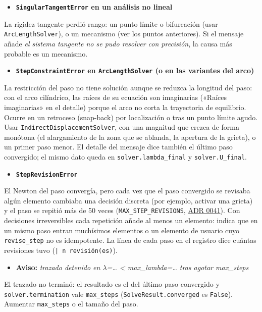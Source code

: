 \documentclass[11pt,oneside]{report}
\begin{document}
\begin{itemize}
  \item \textbf{\texttt{SingularTangentError} en un análisis no lineal}
\end{itemize}
  La rigidez tangente perdió rango: un punto límite o bifurcación (usar \texttt{ArcLengthSolver}), o un mecanismo (ver los puntos anteriores). Si el mensaje añade \textit{\textquotedbl{}el sistema tangente no se pudo resolver con precisión\textquotedbl{}}, la causa más probable es un mecanismo.

\begin{itemize}
  \item \textbf{\texttt{StepConstraintError} en \texttt{ArcLengthSolver} (o en las variantes del arco)}
\end{itemize}
  La restricción del paso no tiene solución aunque se reduzca la longitud del paso: con el arco cilíndrico, las raíces de su ecuación son imaginarias («Raíces imaginarias» en el detalle) porque el arco no corta la trayectoria de equilibrio. Ocurre en un retroceso (snap-back) por localización o tras un punto límite agudo. Usar \texttt{IndirectDisplacementSolver}, con una magnitud que crezca de forma monótona (el alargamiento de la zona que se ablanda, la apertura de la grieta), o un primer paso menor. El detalle del mensaje dice también el último paso convergido; el mismo dato queda en \texttt{solver.\allowbreak{}lambda\_\allowbreak{}final} y \texttt{solver.U\_final}.

\begin{itemize}
  \item \textbf{\texttt{StepRevisionError}}
\end{itemize}
  El Newton del paso convergía, pero cada vez que el paso convergido se revisaba algún elemento cambiaba una decisión discreta (por ejemplo, activar una grieta) y el paso se repitió más de 50 veces (\texttt{MAX\_\allowbreak{}STEP\_\allowbreak{}REVISIONS}, \href{https://github.com/jretamav/solidum-fem/blob/main/docs/adr/0041-revision-del-paso-convergido.md}{ADR 0041}). Con decisiones irreversibles cada repetición añade al menos un elemento: indica que en un mismo paso entran muchísimos elementos o un elemento de usuario cuyo \texttt{revise\_step} no es idempotente. La línea de cada paso en el registro dice cuántas revisiones tuvo (\texttt{| n revisión(es)}).

\begin{itemize}
  \item \textbf{Aviso:} \textit{trazado detenido en \ensuremath{\lambda}=\ldots{} \textless{} max\_lambda=\ldots{} tras agotar max\_steps}
\end{itemize}
  El trazado no terminó: el resultado es el del último paso convergido y \texttt{solver.\allowbreak{}termination} vale \texttt{\textquotedbl{}max\_steps\textquotedbl{}} (\texttt{SolveResult.\allowbreak{}converged} es \texttt{False}). Aumentar \texttt{max\_steps} o el tamaño del paso.
\end{document}
